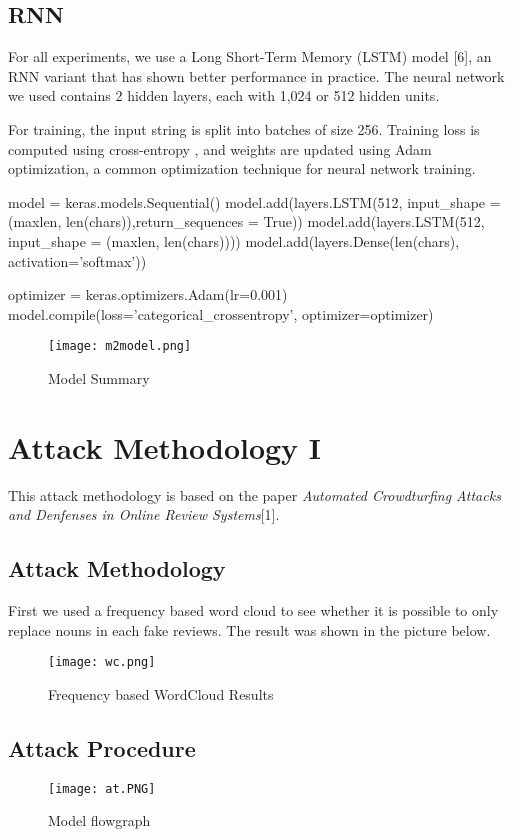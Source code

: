 \documentclass[conference]{IEEEtran}
\begin{document}
\subsection{RNN}
\par For all experiments, we use a Long Short-Term Memory (LSTM) model [6], an RNN variant that has shown better performance in practice. The neural network we used contains 2 hidden layers, each with 1,024 or 512 hidden units. 
\par For training, the input string is split into batches of size 256. Training loss is computed using cross-entropy , and weights are updated using Adam optimization, a common optimization technique for neural network training.
\begin{python}
model = keras.models.Sequential()
model.add(layers.LSTM(512, input_shape = (maxlen, 
          len(chars)),return_sequences = True))
model.add(layers.LSTM(512, input_shape = (maxlen,
          len(chars))))
model.add(layers.Dense(len(chars), 
          activation='softmax'))

optimizer = keras.optimizers.Adam(lr=0.001)
model.compile(loss='categorical_crossentropy', 
              optimizer=optimizer)
\end{python}
\begin{figure}[htbp]
\centerline{\texttt{[image: m2model.png]}}
\caption{Model Summary}
\label{fig}
\end{figure}


\section{Attack Methodology I}
This attack methodology is based on the paper \emph{Automated Crowdturfing Attacks and Denfenses in Online Review Systems}[1].
\subsection{Attack Methodology}
First we used a frequency based word cloud to see whether it is possible to only replace nouns in each fake reviews. The result was shown in the picture below.
\begin{figure}[htbp]
\centerline{\texttt{[image: wc.png]}}
\caption{Frequency based WordCloud Results}
\label{fig}
\end{figure}

\subsection{Attack Procedure}
\begin{figure}[htbp]
\centerline{\texttt{[image: at.PNG]}}
\caption{Model flowgraph}
\label{fig}
\end{figure}
\end{document}
